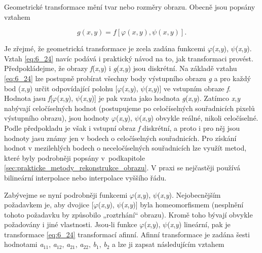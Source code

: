 Geometrické transformace mění tvar nebo rozměry obrazu. Obecně jsou popsány vztahem

\begin{equation} \label{eq:6_24} 
    g\left(x,y\right)=f\left[\varphi \left(x,y\right),\psi \left(x,y\right)\right].  
\end{equation}

Je zřejmé, že geometrická transformace je zcela zadána funkcemi $\varphi$(\textit{x},\textit{y}), $\psi$(\textit{x},\textit{y}). Vztah \eqref{eq:6_24} navíc podává i praktický návod na to, jak transformaci provést. Předpokládejme, že obrazy \textit{f}(\textit{x},\textit{y}) i \textit{g}(\textit{x},\textit{y}) jsou diskrétní. Na základě vztahu \eqref{eq:6_24} lze postupně probírat všechny body výstupního obrazu \textit{g} a pro každý bod (\textit{x},\textit{y}) určit odpovídající polohu [$\varphi$(\textit{x},\textit{y}), $\psi$(\textit{x},\textit{y})] ve vstupním obraze \textit{f}. Hodnota jasu \textit{f}[$\varphi$(\textit{x},\textit{y}), $\psi$(\textit{x},\textit{y})] je pak vzata jako hodnota \textit{g}(\textit{x},\textit{y}). Zatímco \textit{x},\textit{y} nabývají celočíselných hodnot (postupujeme po celočíselných souřadnicích pixelů výstupního obrazu), jsou hodnoty $\varphi$(\textit{x},\textit{y}), $\psi$(\textit{x},\textit{y}) obvykle reálné, nikoli celočíselné. Podle předpokladu je však i vstupní obraz \textit{f} diskrétní, a proto i pro něj jsou hodnoty jasu známy jen v bodech o celočíselných souřadnicích. Pro získání hodnot v mezilehlých bodech o neceločíselných souřadnicích lze využít metod, které byly podrobněji popsány v~podkapitole \ref{sec:prakticke_metody_rekonstrukce_obrazu}. V praxi se nejčastěji používá bilineární interpolace nebo interpolace vyššího řádu.    

Zabývejme se nyní podrobněji funkcemi $\varphi$(\textit{x},\textit{y}), $\psi$(\textit{x},\textit{y}). Nejobecnějším požadavkem je, aby dvojice [$\varphi$(\textit{x},\textit{y}), $\psi$(\textit{x},\textit{y})] byla homeomorfismem (nesplnění tohoto požadavku by způsobilo „roztrhání`` obrazu). Kromě toho bývají obvykle požadovány i jiné vlastnosti. Jsou-li funkce $\varphi$(\textit{x},\textit{y}), $\psi$(\textit{x},\textit{y}) lineární, pak je transformace \eqref{eq:6_24}  transformací afinní. Afinní transformace je zadána šesti hodnotami \textit{a}$_{11}$, \textit{a}$_{12}$, \textit{a}$_{21}$, \textit{a}$_{22}$, \textit{b}$_1$, \textit{b}$_2$ a lze ji zapsat následujícím vztahem

